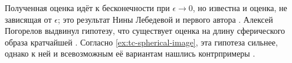 Полученная оценка идёт к бесконечности при $\epsilon\to 0$,
но известна и оценка, не зависящая от $\epsilon$;
это результат Нины Лебедевой и первого автора \cite{lebedeva-petrunin}.
Алексей Погорелов выдвинул гипотезу, что существует оценка на длину сферического образа кратчайшей \cite{pogorelov}.
Согласно \ref{ex:tc-spherical-image}, эта гипотеза сильнее,
однако к ней и всевозможным её вариантам  нашлись контрпримеры \cite{zalgaller,milka,usov,pach}.
